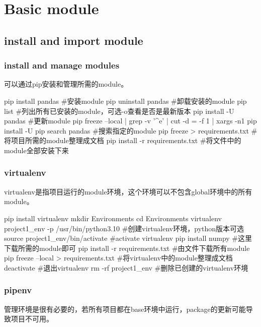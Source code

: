 \section{Basic module}

  \subsection{install and import module}
    \subsubsection{install and manage modules}
      可以通过pip安装和管理所需的module。
      \begin{codeblock}[language=bash, caption={download modules}]
        pip install pandas  #安装module
        pip uninstall pandas  #卸载安装的module
        pip list #列出所有已安装的module，可选-o查看是否是最新版本
        pip install -U pandas #更新module
        pip freeze --local | grep -v '^\-e' | cut -d = -f 1 | xargs -n1 pip install -U
        pip search pandas #搜索指定的module
        pip freeze > requirements.txt #将项目所需的module整理成文档
        pip install -r requirements.txt #将文件中的module全部安装下来
      \end{codeblock}

    \subsubsection{virtualenv}
      virtualenv是指项目运行的module环境，这个环境可以不包含global环境中的所有module。
      \begin{codeblock}[language=bash, caption={setup virtualenv}]
        pip install virtualenv 
        mkdir Environments
        cd Environments
        virtualenv project1_env -p /usr/bin/python3.10 #创建virtualenv环境，python版本可选
        source project1_env/bin/activate #activate virtualenv
        pip install numpy #这里下载所需的module即可
        pip install -r requirements.txt #由文件下载所有module 
        pip freeze --local > requirements.txt #将virtualenv中的module整理成文档
        deactivate #退出virtualenv
        rm -rf project1_env #删除已创建的virtualenv环境
      \end{codeblock}

    \subsubsection{pipenv}
      管理环境是很有必要的，若所有项目都在base环境中运行，package的更新可能导致项目不可用。

